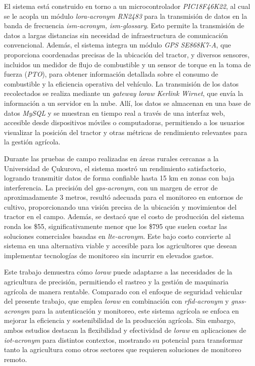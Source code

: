 El sistema está construido en torno a un microcontrolador \textit{PIC18F46K22}, al cual se le acopla un módulo \textit{\acrshort{lora-acronym} RN2483} para la transmisión de datos en la banda de frecuencia \textit{\acrshort{ism-acronym}, \gls{ism-glossary}}. Esto permite la transmisión de datos a largas distancias sin necesidad de infraestructura de comunicación convencional. Además, el sistema integra un módulo \textit{GPS SE868K7-A}, que proporciona coordenadas precisas de la ubicación del tractor, y diversos sensores, incluidos un medidor de flujo de combustible y un sensor de torque en la toma de fuerza (\textit{PTO}), para obtener información detallada sobre el consumo de combustible y la eficiencia operativa del vehículo. La transmisión de los datos recolectados se realiza mediante un \textit{gateway \acrshort{loraw} Kerlink Wirnet}, que envía la información a un servidor en la nube. Allí, los datos se almacenan en una base de datos \textit{MySQL} y se muestran en tiempo real a través de una interfaz web, accesible desde dispositivos móviles o computadoras, permitiendo a los usuarios visualizar la posición del tractor y otras métricas de rendimiento relevantes para la gestión agrícola.

Durante las pruebas de campo realizadas en áreas rurales cercanas a la Universidad de Çukurova, el sistema mostró un rendimiento satisfactorio, logrando transmitir datos de forma confiable hasta 15 km en zonas con baja interferencia. La precisión del \textit{\acrshort{gps-acronym}}, con un margen de error de aproximadamente 3 metros, resultó adecuada para el monitoreo en entornos de cultivo, proporcionando una visión precisa de la ubicación y movimientos del tractor en el campo. Además, se destacó que el costo de producción del sistema ronda los \$55, significativamente menor que los \$795 que suelen costar las soluciones comerciales basadas en \textit{\acrshort{lte-acronym}}. Este bajo costo convierte al sistema en una alternativa viable y accesible para los agricultores que desean implementar tecnologías de monitoreo sin incurrir en elevados gastos.

Este trabajo demuestra cómo \textit{\acrshort{loraw}} puede adaptarse a las necesidades de la agricultura de precisión, permitiendo el rastreo y la gestión de maquinaria agrícola de manera rentable. Comparado con el enfoque de seguridad vehicular del presente trabajo, que emplea \textit{\acrshort{loraw}} en combinación con \textit{\acrshort{rfid-acronym}} y \textit{\acrshort{gnss-acronym}} para la autenticación y monitoreo, este sistema agrícola se enfoca en mejorar la eficiencia y sostenibilidad de la producción agrícola. Sin embargo, ambos estudios destacan la flexibilidad y efectividad de \textit{\acrshort{loraw}} en aplicaciones de \textit{\acrshort{iot-acronym}} para distintos contextos, mostrando su potencial para transformar tanto la agricultura como otros sectores que requieren soluciones de monitoreo remoto.

